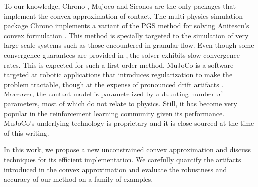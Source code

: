 To our knowledge, Chrono \cite{bib:hrono2016}, Mujoco \cite{bib:mujoco} and
Siconos \cite{bib:acary2019siconos} are the only packages that implement the
convex approximation of contact. The multi-physics simulation package Chrono
implements a variant of the PGS method for solving Anitescu's convex formulation
\cite{bib:tasora2011}. This method is specially targeted to the simulation of
very large scale systems such as those encountered in granular flow. Even though
some convergence guarantees are provided in \cite{bib:anitescu2010}, the solver
exhibits slow convergence rates. This is expected for such a first order method.
MuJoCo is a software targeted at robotic applications that introduces
regularization to make the problem tractable, though at the expense of
pronounced drift artifacts \cite{bib:simbenchmark}. Moreover, the contact model
is parameterized by a daunting number of parameters, most of which do not relate
to physics. Still, it has become very popular in the reinforcement learning
community given its performance. MuJoCo's underlying technology is proprietary
and it is close-sourced at the time of this writing.

In this work, we propose a new unconstrained convex approximation and discuss
techniques for its efficient implementation. We carefully quantify the artifacts
introduced in the convex approximation and evaluate the robustness and accuracy
of our method on a family of examples.

